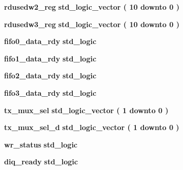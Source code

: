 \begin{DoxyCompactItemize}
\item 
{\bf rdusedw2\+\_\+reg} {\bfseries \textcolor{comment}{std\+\_\+logic\+\_\+vector}\textcolor{vhdlchar}{ }\textcolor{vhdlchar}{(}\textcolor{vhdlchar}{ }\textcolor{vhdlchar}{ } \textcolor{vhdldigit}{10} \textcolor{vhdlchar}{ }\textcolor{keywordflow}{downto}\textcolor{vhdlchar}{ }\textcolor{vhdlchar}{ } \textcolor{vhdldigit}{0} \textcolor{vhdlchar}{ }\textcolor{vhdlchar}{)}\textcolor{vhdlchar}{ }} 
\item 
{\bf rdusedw3\+\_\+reg} {\bfseries \textcolor{comment}{std\+\_\+logic\+\_\+vector}\textcolor{vhdlchar}{ }\textcolor{vhdlchar}{(}\textcolor{vhdlchar}{ }\textcolor{vhdlchar}{ } \textcolor{vhdldigit}{10} \textcolor{vhdlchar}{ }\textcolor{keywordflow}{downto}\textcolor{vhdlchar}{ }\textcolor{vhdlchar}{ } \textcolor{vhdldigit}{0} \textcolor{vhdlchar}{ }\textcolor{vhdlchar}{)}\textcolor{vhdlchar}{ }} 
\item 
{\bf fifo0\+\_\+data\+\_\+rdy} {\bfseries \textcolor{comment}{std\+\_\+logic}\textcolor{vhdlchar}{ }} 
\item 
{\bf fifo1\+\_\+data\+\_\+rdy} {\bfseries \textcolor{comment}{std\+\_\+logic}\textcolor{vhdlchar}{ }} 
\item 
{\bf fifo2\+\_\+data\+\_\+rdy} {\bfseries \textcolor{comment}{std\+\_\+logic}\textcolor{vhdlchar}{ }} 
\item 
{\bf fifo3\+\_\+data\+\_\+rdy} {\bfseries \textcolor{comment}{std\+\_\+logic}\textcolor{vhdlchar}{ }} 
\item 
{\bf tx\+\_\+mux\+\_\+sel} {\bfseries \textcolor{comment}{std\+\_\+logic\+\_\+vector}\textcolor{vhdlchar}{ }\textcolor{vhdlchar}{(}\textcolor{vhdlchar}{ }\textcolor{vhdlchar}{ } \textcolor{vhdldigit}{1} \textcolor{vhdlchar}{ }\textcolor{keywordflow}{downto}\textcolor{vhdlchar}{ }\textcolor{vhdlchar}{ } \textcolor{vhdldigit}{0} \textcolor{vhdlchar}{ }\textcolor{vhdlchar}{)}\textcolor{vhdlchar}{ }} 
\item 
{\bf tx\+\_\+mux\+\_\+sel\+\_\+d} {\bfseries \textcolor{comment}{std\+\_\+logic\+\_\+vector}\textcolor{vhdlchar}{ }\textcolor{vhdlchar}{(}\textcolor{vhdlchar}{ }\textcolor{vhdlchar}{ } \textcolor{vhdldigit}{1} \textcolor{vhdlchar}{ }\textcolor{keywordflow}{downto}\textcolor{vhdlchar}{ }\textcolor{vhdlchar}{ } \textcolor{vhdldigit}{0} \textcolor{vhdlchar}{ }\textcolor{vhdlchar}{)}\textcolor{vhdlchar}{ }} 
\item 
{\bf wr\+\_\+status} {\bfseries \textcolor{comment}{std\+\_\+logic}\textcolor{vhdlchar}{ }} 
\item 
{\bf diq\+\_\+ready} {\bfseries \textcolor{comment}{std\+\_\+logic}\textcolor{vhdlchar}{ }} 

\end{DoxyCompactItemize}

